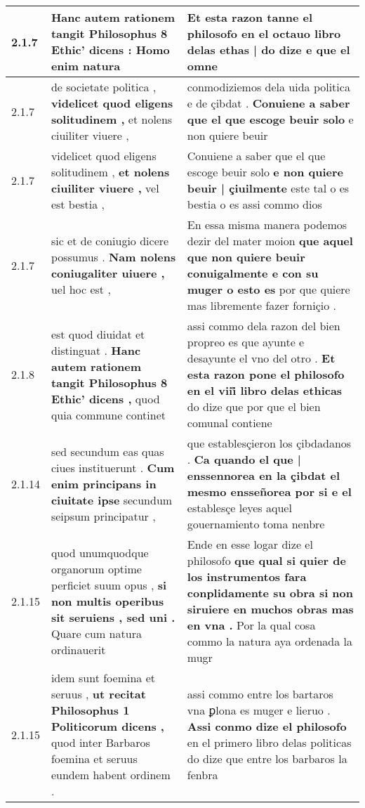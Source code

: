 \begin{tabular}{|p{1cm}|p{6.5cm}|p{6.5cm}|}
2.1.7 & Hanc autem rationem tangit Philosophus \textbf{ 8 Ethic’ dicens : } Homo enim natura & Et esta razon tanne el philosofo \textbf{ en el octauo libro delas ethas | do dize } e que el omne \\\hline
2.1.7 & de societate politica , \textbf{ videlicet quod eligens solitudinem , } et nolens ciuiliter viuere , & conmodiziemos dela uida politica e de çibdat . \textbf{ Conuiene a saber que el que escoge beuir solo } e non quiere beuir \\\hline
2.1.7 & videlicet quod eligens solitudinem , \textbf{ et nolens ciuiliter viuere , } vel est bestia , & Conuiene a saber que el que escoge beuir solo \textbf{ e non quiere beuir | çiuilmente } este tal o es bestia o es assi commo dios \\\hline
2.1.7 & sic et de coniugio dicere possumus . \textbf{ Nam nolens coniugaliter uiuere , } uel hoc est , & En essa misma manera podemos dezir del mater moion \textbf{ que aquel que non quiere beuir conuigalmente e con su muger o esto es } por que quiere mas libremente fazer forniçio . \\\hline
2.1.8 & est quod diuidat et distinguat . \textbf{ Hanc autem rationem tangit Philosophus 8 Ethic’ dicens , } quod quia commune continet & assi commo dela razon del bien propreo es que ayunte e desayunte el vno del otro . \textbf{ Et esta razon pone el philosofo en el viii̊ libro delas ethicas } do dize que por que el bien comunal contiene \\\hline
2.1.14 & sed secundum eas quas ciues instituerunt . \textbf{ Cum enim principans in ciuitate ipse } secundum seipsum principatur , & que establesçieron los çibdadanos . \textbf{ Ca quando el que | enssennorea en la çibdat el mesmo ensseñorea por si e el } establesçe leyes aquel gouernamiento toma nenbre \\\hline
2.1.15 & quod unumquodque organorum optime perficiet suum opus , \textbf{ si non multis operibus sit seruiens , sed uni . } Quare cum natura ordinauerit & Ende en esse logar dize el philosofo \textbf{ que qual si quier de los instrumentos fara conplidamente su obra si non siruiere en muchos obras mas en vna . } Por la qual cosa commo la natura aya ordenada la mugr \\\hline
2.1.15 & idem sunt foemina et seruus , \textbf{ ut recitat Philosophus 1 Politicorum dicens , } quod inter Barbaros foemina et seruus eundem habent ordinem . & assi commo entre los bartaros vna ꝑlona es muger e lieruo . \textbf{ Assi conmo dize el philosofo } en el primero libro delas politicas do dize que entre los barbaros la fenbra \\\hline

\end{tabular}
